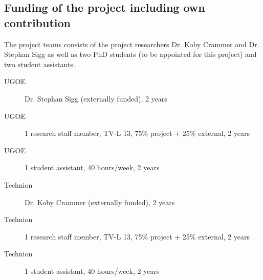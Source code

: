 \documentclass[12pt]{article}
\begin{document}
\subsection*{Funding of the project including own contribution}
The project teams consists of the project researchers Dr. Koby Crammer and Dr. Stephan Sigg as well as two PhD students (to be appointed for this project) and two student assistants.
\begin{description}
	\item[UGOE] Dr. Stephan Sigg (externally funded), 2 years
	\item[UGOE] 1 research staff member, TV-L 13, 75\% project + 25\% external, 2 years
	\item[UGOE] 1 student assistant, 40 hours/week, 2 years
	\item[Technion] Dr. Koby Crammer (externally funded), 2 years 
	\item[Technion] 1 research staff member, TV-L 13, 75\% project + 25\% external, 2 years 
	\item[Technion] 1 student assistant, 40 hours/week, 2 years 
\end{description}


%
%
% 
% 
\end{document}
